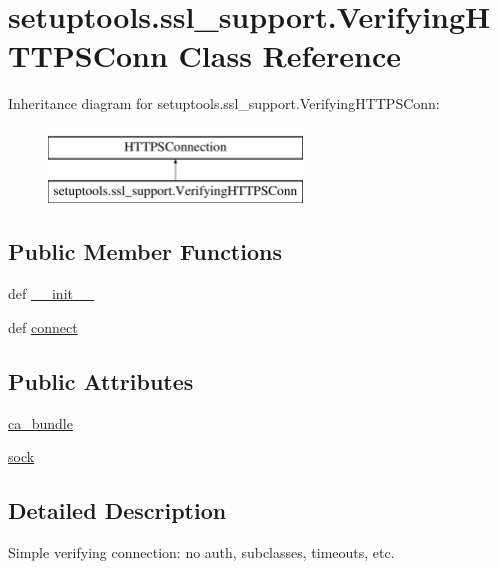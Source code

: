 \hypertarget{classsetuptools_1_1ssl__support_1_1VerifyingHTTPSConn}{}\section{setuptools.\+ssl\+\_\+support.\+Verifying\+H\+T\+T\+P\+S\+Conn Class Reference}
\label{classsetuptools_1_1ssl__support_1_1VerifyingHTTPSConn}
Inheritance diagram for setuptools.\+ssl\+\_\+support.\+Verifying\+H\+T\+T\+P\+S\+Conn\+:\begin{figure}[H]
\begin{center}
\leavevmode
\includegraphics[height=2.000000cm]{classsetuptools_1_1ssl__support_1_1VerifyingHTTPSConn}
\end{center}
\end{figure}
\subsection*{Public Member Functions}
\begin{DoxyCompactItemize}
\item 
def \hyperlink{classsetuptools_1_1ssl__support_1_1VerifyingHTTPSConn_a67a0a5c83d7aa611a70516f5954770e1}{\+\_\+\+\_\+init\+\_\+\+\_\+}
\item 
def \hyperlink{classsetuptools_1_1ssl__support_1_1VerifyingHTTPSConn_ac22f2182197daba14f22dd4edceba63f}{connect}
\end{DoxyCompactItemize}
\subsection*{Public Attributes}
\begin{DoxyCompactItemize}
\item 
\hyperlink{classsetuptools_1_1ssl__support_1_1VerifyingHTTPSConn_ae2821bf00c5c65578971e64777ebe05a}{ca\+\_\+bundle}
\item 
\hyperlink{classsetuptools_1_1ssl__support_1_1VerifyingHTTPSConn_a926c771230a413e8dfbd9a76c590ca18}{sock}
\end{DoxyCompactItemize}


\subsection{Detailed Description}
\begin{DoxyVerb}Simple verifying connection: no auth, subclasses, timeouts, etc.\end{DoxyVerb}
 

